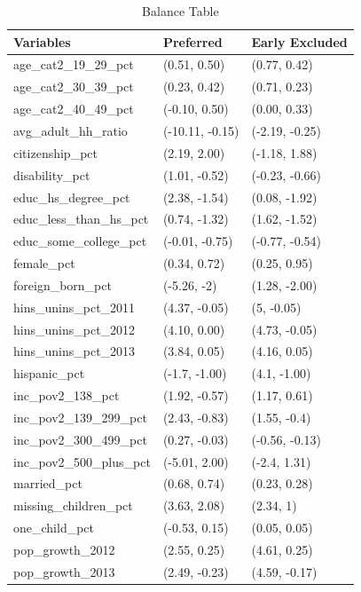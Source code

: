 \documentclass[aoas]{imsart}
\theoremstyle{plain}
\theoremstyle{remark}
\begin{document}
\begin{appendix}
\begin{table}[ht]
\centering
    \caption{Balance Table}
    \label{tab:baltab1}
\begin{tabular}{lll}
  \hline
Variables & Preferred & Early Excluded \\ 
  \hline
age\_cat2\_19\_29\_pct & (0.51, 0.50) & (0.77, 0.42) \\ 
  age\_cat2\_30\_39\_pct & (0.23, 0.42) & (0.71, 0.23) \\ 
  age\_cat2\_40\_49\_pct & (-0.10, 0.50) & (0.00, 0.33) \\ 
  avg\_adult\_hh\_ratio & (-10.11, -0.15) & (-2.19, -0.25) \\ 
  citizenship\_pct & (2.19, 2.00) & (-1.18, 1.88) \\ 
  disability\_pct & (1.01, -0.52) & (-0.23, -0.66) \\ 
  educ\_hs\_degree\_pct & (2.38, -1.54) & (0.08, -1.92) \\ 
  educ\_less\_than\_hs\_pct & (0.74, -1.32) & (1.62, -1.52) \\ 
  educ\_some\_college\_pct & (-0.01, -0.75) & (-0.77, -0.54) \\ 
  female\_pct & (0.34, 0.72) & (0.25, 0.95) \\ 
  foreign\_born\_pct & (-5.26, -2) & (1.28, -2.00) \\ 
  hins\_unins\_pct\_2011 & (4.37, -0.05) & (5, -0.05) \\ 
  hins\_unins\_pct\_2012 & (4.10, 0.00) & (4.73, -0.05) \\ 
  hins\_unins\_pct\_2013 & (3.84, 0.05) & (4.16, 0.05) \\ 
  hispanic\_pct & (-1.7, -1.00) & (4.1, -1.00) \\ 
  inc\_pov2\_138\_pct & (1.92, -0.57) & (1.17, 0.61) \\ 
  inc\_pov2\_139\_299\_pct & (2.43, -0.83) & (1.55, -0.4) \\ 
  inc\_pov2\_300\_499\_pct & (0.27, -0.03) & (-0.56, -0.13) \\ 
  inc\_pov2\_500\_plus\_pct & (-5.01, 2.00) & (-2.4, 1.31) \\ 
  married\_pct & (0.68, 0.74) & (0.23, 0.28) \\ 
  missing\_children\_pct & (3.63, 2.08) & (2.34, 1) \\ 
  one\_child\_pct & (-0.53, 0.15) & (0.05, 0.05) \\ 
  pop\_growth\_2012 & (2.55, 0.25) & (4.61, 0.25) \\ 
  pop\_growth\_2013 & (2.49, -0.23) & (4.59, -0.17) \\ 

\end{tabular}
\end{table}
\end{appendix}
\end{document}
